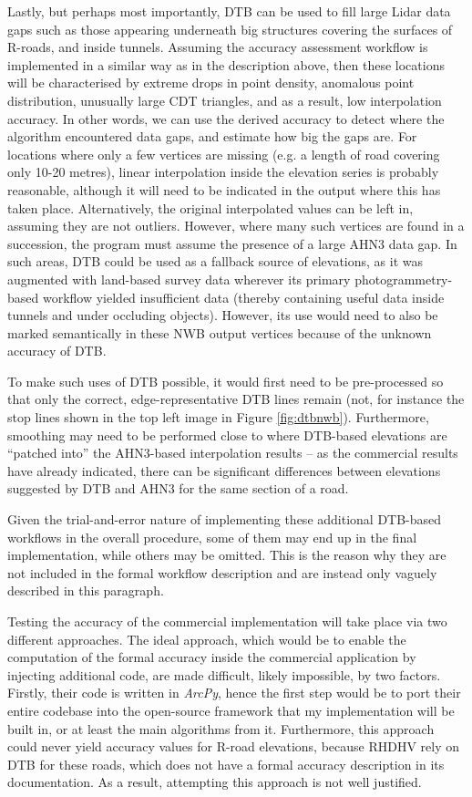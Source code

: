 Lastly, but perhaps most importantly, DTB can be used to fill large Lidar data gaps such as those appearing underneath big structures covering the surfaces of R-roads, and inside tunnels. Assuming the accuracy assessment workflow is implemented in a similar way as in the description above, then these locations will be characterised by extreme drops in point density, anomalous point distribution, unusually large CDT triangles, and as a result, low interpolation accuracy. In other words, we can use the derived accuracy to detect  where the algorithm encountered data gaps, and estimate how big the gaps are. For locations where only a few vertices are missing (e.g. a length of road covering only 10-20 metres), linear interpolation inside the elevation series is probably reasonable, although it will need to be indicated in the output where this has taken place. Alternatively, the original interpolated values can be left in, assuming they are not outliers. However, where many such vertices are found in a succession, the program must assume the presence of a large AHN3 data gap. In such areas, DTB could be used as a fallback source of elevations, as it was augmented with land-based survey data wherever its primary photogrammetry-based workflow yielded insufficient data (thereby containing useful data inside tunnels and under occluding objects). However, its use would need to also be marked semantically in these NWB output vertices because of the unknown accuracy of DTB.

To make such uses of DTB possible, it would first need to be pre-processed so that only the correct, edge-representative DTB lines remain (not, for instance the stop lines shown in the top left image in Figure \ref{fig:dtbnwb}). Furthermore, smoothing may need to be performed close to where DTB-based elevations are “patched into” the AHN3-based interpolation results – as the commercial results have already indicated, there can be significant differences between elevations suggested by DTB and AHN3 for the same section of a road. 

Given the trial-and-error nature of implementing these additional DTB-based workflows in the overall procedure, some of them may end up in the final implementation, while others may be omitted. This is the reason why they are not included in the formal workflow description and are instead only vaguely described in this paragraph.

Testing the accuracy of the commercial implementation will take place via two different approaches. The ideal approach, which would be to enable the computation of the formal accuracy inside the commercial application by injecting additional code, are made difficult, likely impossible, by two factors. Firstly, their code is written in \textit{ArcPy}, hence the first step would be to port their entire codebase into the open-source framework that my implementation will be built in, or at least the main algorithms from it. Furthermore, this approach could never yield accuracy values for R-road elevations, because RHDHV rely on DTB for these roads, which does not have a formal accuracy description in its documentation. As a result, attempting this approach is not well justified.

